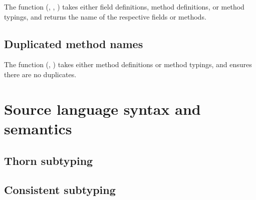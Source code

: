 \documentclass[acmlarge, anonymous, authordraft, review]{acmart} %
\begin{document}
The  function (, , ) takes either field definitions, method definitions, or 
method typings, and returns the name of the respective fields or methods.

\subsection{Duplicated method names}

The  function (, ) takes either
method definitions or method typings, and ensures there are no duplicates.

\section{Source language syntax and semantics}

\subsection{Thorn subtyping}


\begin{mathpar}





\end{mathpar}

\subsection{Consistent subtyping}

\begin{mathpar}


\end{mathpar}
\end{document}
